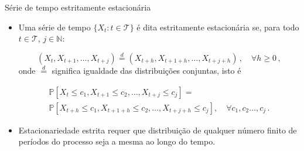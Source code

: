 \documentclass[11pt]{beamer}
\begin{document}
	\begin{frame}{Série de tempo estritamente estacionária}
		\begin{itemize}
			\item Uma série de tempo $\{X_t: t \in \mathcal{T}\}$ é dita estritamente estacionária se, para todo $t \in \mathcal{T}$, $j\in \mathbb{N}$:
			
			$$(X_t, X_{t+1}, \ldots, X_{t+j}) \overset{d}{=} (X_{t+h}, X_{t+1+h}, \ldots, X_{t+j+h})\,, \quad \forall h \geq 0 \, , $$
			onde $\overset{d}{=}$ significa igualdade das distribuições conjuntas, isto é
			
			\begin{align*}
				\mathbb{P}[X_t \leq c_1, X_{t+1} \leq c_2, \ldots, X_{t+j} \leq c_j ] = \\ \mathbb{P}[X_{t+h} \leq c_1, X_{t+1+h} \leq c_2, \ldots, X_{t+j+h} \leq c_j ], \quad \forall c_1,c_2\ldots, c_j \, .
			\end{align*}
			
			\item Estacionariedade estrita requer que distribuição de qualquer número finito de períodos do processo seja a mesma ao longo do tempo.
		\end{itemize}
	\end{frame}
	
\end{document}
